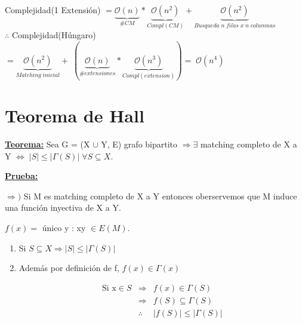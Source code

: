 \documentclass[12pt,a4paper]{report}
\begin{document}
\begin{enumerate}
							\begin{center}
								Complejidad(1 Extensión) $= \underbrace{\mathcal{O}(n)}_{\# CM} * \underbrace{\mathcal{O}(n^{2})}_{Compl(CM)} + \underbrace{\mathcal{O}(n^{2})}_{Busqueda \; \textit{n} \; filas \; x \; \textit{n} \; columnas }$ \\
								\vspace{5mm}
								$\therefore$ Complejidad(Húngaro) $= \underbrace{\mathcal{O}(n^{2})}_{Matching \; inicial} + \; (\underbrace{\mathcal{O}(n)}_{\#extensiones} * \underbrace{\mathcal{O}(n^{3})}_{Compl(extension)}) = \; \mathcal{O}(n^{4})$
							\end{center}				
			\end{enumerate}
	
	\section{Teorema de Hall}
	
		\textbf{\underline{Teorema:}} Sea G = (X $\cup$ Y, E) grafo bipartito $\Rightarrow \exists$ matching completo de X a Y $\Leftrightarrow \; \lvert S \rvert \leq \lvert \Gamma(S) \rvert \; \forall S \subseteq X$.
		
		\vspace{3mm}
		\textbf{\underline{Prueba:}}

			$\Rightarrow)$ Si M es matching completo de X a Y entonces oberservemos que M induce una función inyectiva de X a Y.
			
			\begin{center}
				$f(x) = $ único y : xy $\in E(M)$.
			\end{center}
			
			\begin{enumerate}
				\item Si $S \subseteq X \Rightarrow \lvert S \rvert \leq \lvert \Gamma(S) \rvert$

				
				\item Además por definición de f, $f(x) \in \Gamma(x)$
				
				\begin{eqnarray}
					\nonumber \text{Si x} \in S & \Rightarrow & f(x) \in \Gamma(S) \\
					\nonumber & \Rightarrow & f(S) \subseteq \Gamma(S) \\
					\nonumber &\therefore & \lvert f(S) \rvert \leq \lvert \Gamma(S) \rvert
				\end{eqnarray}
				
			\end{enumerate}
			
\end{document}
